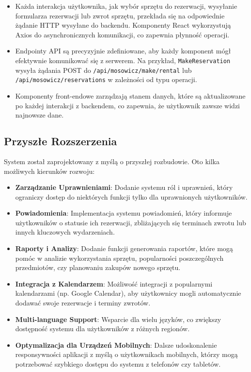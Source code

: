 \documentclass{article}
\begin{document}
\begin{itemize}
    \item Każda interakcja użytkownika, jak wybór sprzętu do rezerwacji, wysyłanie formularza rezerwacji lub zwrot sprzętu, przekłada się na odpowiednie żądanie HTTP wysyłane do backendu. Komponenty React wykorzystują Axios do asynchronicznych komunikacji, co zapewnia płynność operacji.
    \item Endpointy API są precyzyjnie zdefiniowane, aby każdy komponent mógł efektywnie komunikować się z serwerem. Na przykład, \texttt{MakeReservation} wysyła żądania POST do \texttt{/api/mosowicz/make/rental} lub \texttt{/api/mosowicz/reservations} w zależności od typu operacji.
    \item Komponenty front-endowe zarządzają stanem danych, które są aktualizowane po każdej interakcji z backendem, co zapewnia, że użytkownik zawsze widzi najnowsze dane.
\end{itemize}

\subsection{Przyszłe Rozszerzenia}

System został zaprojektowany z myślą o przyszłej rozbudowie. Oto kilka możliwych kierunków rozwoju:

\begin{itemize}
    \item \textbf{Zarządzanie Uprawnieniami}: Dodanie systemu ról i uprawnień, który ograniczy dostęp do niektórych funkcji tylko dla uprawnionych użytkowników.
    \item \textbf{Powiadomienia}: Implementacja systemu powiadomień, który informuje użytkowników o statusie ich rezerwacji, zbliżających się terminach zwrotu lub innych kluczowych wydarzeniach.
    \item \textbf{Raporty i Analizy}: Dodanie funkcji generowania raportów, które mogą pomóc w analizie wykorzystania sprzętu, popularności poszczególnych przedmiotów, czy planowaniu zakupów nowego sprzętu.
    \item \textbf{Integracja z Kalendarzem}: Możliwość integracji z popularnymi kalendarzami (np. Google Calendar), aby użytkownicy mogli automatycznie dodawać swoje rezerwacje i terminy zwrotów.
    \item \textbf{Multi-language Support}: Wsparcie dla wielu języków, co zwiększy dostępność systemu dla użytkowników z różnych regionów.
    \item \textbf{Optymalizacja dla Urządzeń Mobilnych}: Dalsze udoskonalenie responsywności aplikacji z myślą o użytkownikach mobilnych, którzy mogą potrzebować szybkiego dostępu do systemu z telefonów czy tabletów.
\end{itemize}
\end{document}
